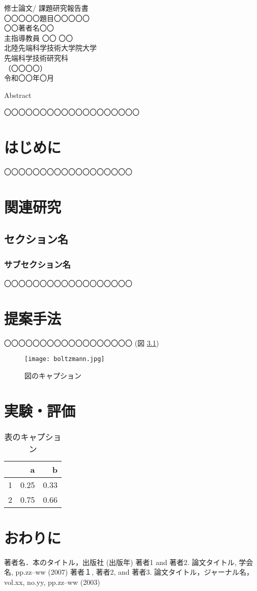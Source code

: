 \documentclass[12pt,a4j]{jreport}
\begin{document}
\thispagestyle{empty}
\begin{center}
修士論文/ 課題研究報告書\\%
\vfill
〇〇〇〇〇題目〇〇〇〇〇\\
\vfill
〇〇著者名〇〇\\
\vfill
主指導教員  〇〇 〇〇\\
\vfill
北陸先端科学技術大学院大学\\
先端科学技術研究科\\
（〇〇〇〇）\\ %
\vfill
令和〇〇年〇月\\ %
\vfill
\end{center}
\clearpage
\centerline{Abstract}
〇〇〇〇〇〇〇〇〇〇〇〇〇〇〇〇〇〇〇
\clearpage
\tableofcontents\thispagestyle{empty}
\listoffigures\thispagestyle{empty}
\listoftables\thispagestyle{empty}
\setcounter{page}{0}
\chapter{はじめに}
〇〇〇〇〇〇〇〇〇〇〇〇〇〇〇〇〇〇\cite{ref1,ref2}
\chapter{関連研究}
\section{セクション名}
\subsection{サブセクション名}
〇〇〇〇〇〇〇〇〇〇〇〇〇〇〇〇〇〇
\chapter{提案手法}
〇〇〇〇〇〇〇〇〇〇〇〇〇〇〇〇〇〇 (図 \ref{fig1})
\begin{figure}
\centerline{\texttt{[image: boltzmann.jpg]}}
\caption{図のキャプション}\label{fig1}
\end{figure}
\chapter{実験・評価}
\begin{table}
\centering
\begin{tabular}{r|rr}
& a & b\\ \hline
1& 0.25 & 0.33\\
2& 0.75 & 0.66\\
\end{tabular}
\caption{表のキャプション}\label{table1}
\end{table}
\chapter{おわりに}

\renewcommand{\bibname}{参考文献}
\begin{thebibliography}{99}
 著者名．本のタイトル，出版社 (出版年)
 著者1 and 著者2. 論文タイトル, 学会名, pp.zz--ww (2007)
 著者１, 著者2, and 著者3. 論文タイトル，ジャーナル名，vol.xx, no.yy, pp.zz--ww (2003)
\end{thebibliography}
\end{document}
